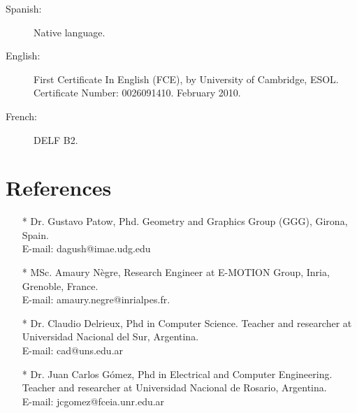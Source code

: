 \documentclass[a4paper,12pt]{article}
\begin{document}
\begin{small}
\begin{description}
	\item[Spanish:] Native language.
	\item[English:] First Certificate In English (FCE), by University of Cambridge, ESOL. Certificate Number: 0026091410. February 2010.
	\item[French:] DELF B2.
\end{description}
\end{small}

\section*{References}

\begin{itemize}
	\item[*] Dr. Gustavo Patow, Phd. Geometry and Graphics Group (GGG), Girona, Spain.\\E-mail: dagush@imae.udg.edu \\
	\item[*] MSc. Amaury Nègre, Research Engineer at E-MOTION Group, Inria, Grenoble, France.\\E-mail: amaury.negre@inrialpes.fr. \\
	\item[*] Dr. Claudio Delrieux, Phd in Computer Science. Teacher and researcher at Universidad Nacional del Sur, Argentina.\\E-mail: cad@uns.edu.ar\\
	\item[*] Dr. Juan Carlos G\'omez, Phd in Electrical and Computer Engineering. Teacher and researcher at Universidad Nacional de Rosario, Argentina.\\E-mail: jcgomez@fceia.unr.edu.ar\\
\end{itemize}
\end{document}
